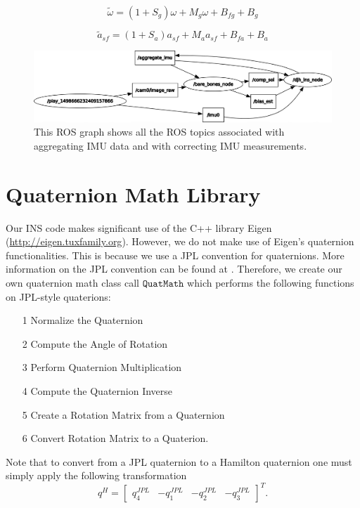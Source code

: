 \documentclass[11pt,a4paper]{article}
\begin{document}
\begin{equation}
	\tilde{\omega} = (1 + S_g)\omega + M_g \omega + B_{fg} + B_g
	\label{fig:gyrocorrect}
\end{equation}

\begin{equation}
	\tilde{a}_{sf} = (1 + S_a)a_{sf} + M_a a_{sf} + B_{fa} + B_a
	\label{fig:accelcorrect}
\end{equation}

\begin{figure}
	\centering
	\includegraphics[scale=0.42]{withonlinebias}
	\caption{This ROS graph shows all the ROS topics associated with aggregating IMU data and with correcting IMU measurements.}
	\label{fig:withonlinebias}
\end{figure}

\section{Quaternion Math Library}

Our INS code makes significant use of the C++ library Eigen (\url{http://eigen.tuxfamily.org}). However, we do not make use of Eigen's quaternion functionalities. This is because we use a JPL convention for quaternions. More information on the JPL convention can be found at \cite{Trawny:2005,Barfoot:2011,Wie:2008}. Therefore, we create our own quaternion math class call $\texttt{QuatMath}$ which performs the following functions on JPL-style quaterions:
\begin{itemize}
	\item[1] Normalize the Quaternion
	\item[2] Compute the Angle of Rotation
	\item[3] Perform Quaternion Multiplication
	\item[4] Compute the Quaternion Inverse
	\item[5] Create a Rotation Matrix from a Quaternion
	\item[6] Convert Rotation Matrix to a Quaterion.
\end{itemize}
Note that to convert from a JPL quaternion to a Hamilton quaternion one must simply apply the following transformation
\begin{equation}
	q^{H}  = \left[\begin{array}{cccc} q^{JPL}_4 & -q^{JPL}_1  & -q^{JPL}_2  & -q^{JPL}_3 \end{array}\right]^T.
\end{equation}
\end{document}
